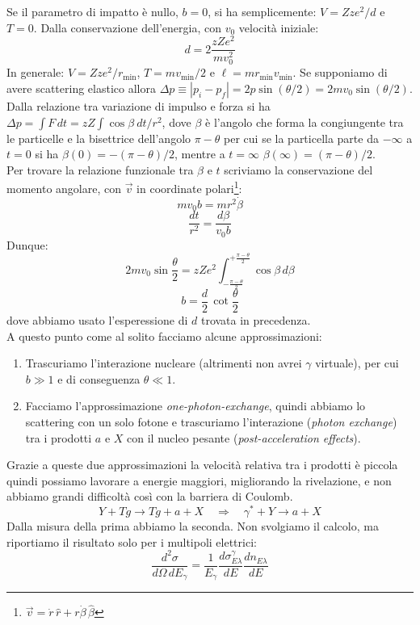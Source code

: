 \noindent Se il parametro di impatto è nullo, $b=0$, si ha semplicemente: $V=Zz e^2 / d$ e $T=0$. Dalla conservazione dell'energia, con $v_0$ velocità iniziale:
$$d= 2\frac{zZe^2}{mv_0^2}$$
In generale: $V=Zz e^2 / r_{\min{}}$, $T=m v_{\min{}}/2$ e $\ell = m r_{\min{}}v_{\min{}}$. Se supponiamo di avere scattering elastico allora $\Delta p\equiv |p_i-p_f| = 2p \sin{(\theta/2)} = 2m v_0 \sin{(\theta/2)}$. Dalla relazione tra variazione di impulso e forza si ha $\Delta p = \int F\, dt = zZ \int \cos{\beta}\: dt/r^2 $, dove $\beta$ è l'angolo che forma la congiungente tra le particelle e la bisettrice dell'angolo $\pi - \theta$ per cui se la particella parte da $-\infty$ a $t=0$ si ha $\beta(0) = - (\pi-\theta)/2$, mentre a $t=\infty$ $\beta(\infty) = (\pi-\theta)/2$.\\
Per trovare la relazione funzionale tra $\beta$ e $t$ scriviamo la conservazione del momento angolare, con $\vec{v}$ in coordinate polari\footnote{$\vec{v} = \dot{r}\, \hat{r} + r \dot{\beta}\, \hat{\beta}$}:
$$m v_0 b = m r^2 \dot{\beta} $$
$$\frac{dt}{r^2} = \frac{d\beta}{v_0b}$$
Dunque:
$$2mv_0 \sin{\frac{\theta}{2}} = zZe^2 \int_{-\frac{\pi-\theta}{2}}^{+\frac{\pi-\theta}{2}} \cos{\beta} \, d\beta$$
$$b = \frac{d}{2}\, \cot{\frac{\theta}{2}}$$
dove abbiamo usato l'esperessione di $d$ trovata in precedenza.\\
A questo punto come al solito facciamo alcune approssimazioni:
\begin{enumerate}
	\item Trascuriamo l'interazione nucleare (altrimenti non avrei $\gamma$ virtuale), per cui $b\gg1$ e di conseguenza $\theta\ll1$.
	\item Facciamo l'approssimazione \textit{one-photon-exchange}, quindi abbiamo lo scattering con un solo fotone e trascuriamo l'interazione (\textit{photon exchange}) tra i prodotti $a$ e $X$ con il nucleo pesante (\textit{post-acceleration effects}).%
\end{enumerate}
\noindent Grazie a queste due approssimazioni la velocità relativa tra i prodotti è piccola quindi possiamo lavorare a energie maggiori, migliorando la rivelazione, e non abbiamo grandi difficoltà così con la barriera di Coulomb.
$$Y + Tg \to Tg + a + X \quad \Rightarrow \quad \gamma^* + Y \to a + X$$
Dalla misura della prima abbiamo la seconda. Non svolgiamo il calcolo, ma riportiamo il risultato solo per i multipoli elettrici:
$$\frac{d^2\sigma}{d\Omega\, dE_\gamma} = \frac{1}{E_\gamma} \frac{d \sigma_{E\lambda}^\gamma}{dE} \frac{dn_{E\lambda}}{dE}$$ 
